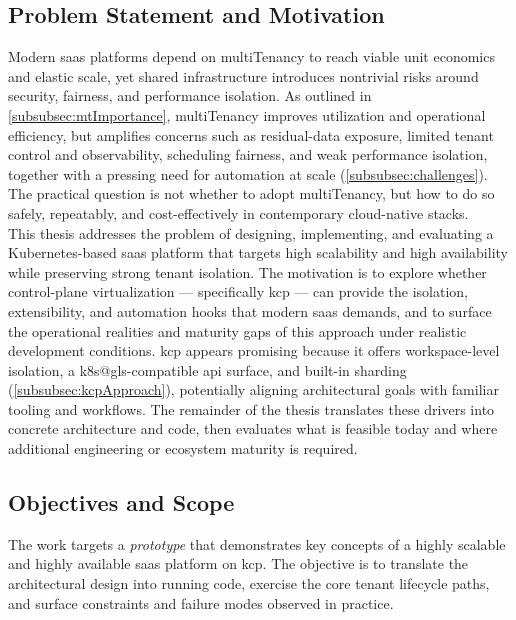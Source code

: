\documentclass[11pt, a4paper, oneside, listof=totoc]{scrartcl}
\begin{document}
        \subsection{Problem Statement and Motivation}\label{subsec:problem}
            Modern \gls{saas} platforms depend on \gls{multiTenancy} to reach viable unit economics and
            elastic scale, yet shared infrastructure introduces nontrivial risks around security,
            fairness, and performance isolation.
            As outlined in \autoref{subsubsec:mtImportance}, \gls{multiTenancy} improves utilization and
            operational efficiency, but amplifies concerns such as residual-data exposure,
            limited tenant control and observability, scheduling fairness, and weak performance
            isolation, together with a pressing need for automation at scale
            (\autoref{subsubsec:challenges}).
            The practical question is not whether to adopt \gls{multiTenancy}, but how to do so safely,
            repeatably, and cost-effectively in contemporary cloud-native stacks.\\
            This thesis addresses the problem of designing, implementing, and evaluating a
            Kubernetes-based \gls{saas} platform that targets high scalability and high availability
            while preserving strong tenant isolation.
            The motivation is to explore whether control-plane virtualization --- specifically
            \gls{kcp} --- can provide the isolation, extensibility, and automation hooks that modern
            \gls{saas} demands, and to surface the operational realities and maturity gaps of this
            approach under realistic development conditions.
            \gls{kcp} appears promising because it offers workspace-level isolation, a
            \gls{k8s@gls}-compatible \gls{api} surface, and built-in sharding
            (\autoref{subsubsec:kcpApproach}), potentially aligning architectural goals with
            familiar tooling and workflows.
            The remainder of the thesis translates these drivers into concrete architecture and
            code, then evaluates what is feasible today and where additional engineering or
            ecosystem maturity is required.

        \subsection{Objectives and Scope}\label{subsec:objectivesAndScope}
            The work targets a \emph{prototype} that demonstrates key concepts of a highly scalable
            and highly available \gls{saas} platform on \gls{kcp}.
            The objective is to translate the architectural design into running code, exercise the
            core tenant lifecycle paths, and surface constraints and failure modes observed in
            practice.
\end{document}

